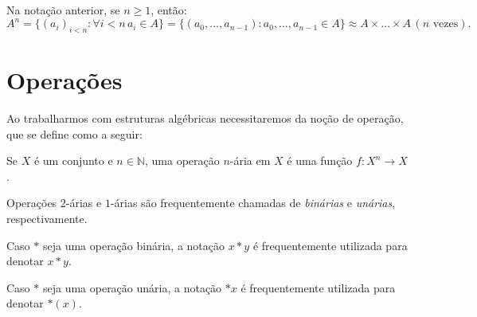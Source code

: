     Na notação anterior, se $n\geq 1$, então:
    \[A^n=\{(a_i)_{i<n}:\forall i<n\, a_i \in A\}=\{(a_0, \dots, a_{n-1}):a_0, \dots, a_{n-1}\in A\}\approx A\times \dots \times A \,(n \text{ vezes}).\]

    \section{Operações}
Ao trabalharmos com estruturas algébricas necessitaremos da noção de operação, que se define como a seguir:
\begin{definition}
    Se $X$ é um conjunto e $n \in \mathbb N$, uma operação $n$-ária em $X$ é uma função $f:X^n\rightarrow X$.
\end{definition}

Operações $2$-árias e $1$-árias são frequentemente chamadas de \emph{binárias} e \emph{unárias}, respectivamente.

Caso $*$ seja uma operação binária, a notação $x*y$ é frequentemente utilizada para denotar $x*y$.

Caso $*$ seja uma operação unária, a notação $*x$ é frequentemente utilizada para denotar $*(x)$.
